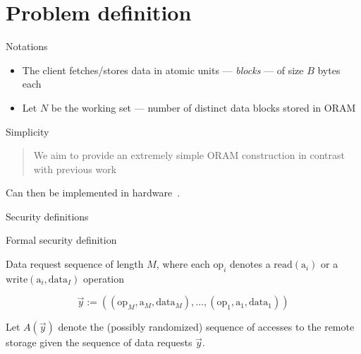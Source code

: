 
\section{Problem definition}

	\begin{frame}{Notations}
		
		\begin{itemize}
			\item 
				The client fetches/stores data in atomic units --- \emph{blocks} --- of size $B$ bytes each
			\item 
				Let $N$ be the working set --- number of distinct data blocks stored in ORAM
		\end{itemize}

	\end{frame}

	\begin{frame}{Simplicity}
		
		\begin{quote}
			We aim to provide an extremely simple ORAM construction in contrast with previous work
		\end{quote}
		
		Can then be implemented in hardware~\cite{Maas:EECS-2014-89}.

	\end{frame}

	\begin{frame}{Security definitions}
		
		\begin{block}{Formal security definition}
			
			Data request sequence of length $M$, where each $\text{op}_i$ denotes a $\text{read}(\text{a}_i)$ or a $\text{write}(\text{a}_i, \text{data}_I)$ operation
			
			\[
				\vec{y} := ( (\text{op}_M, \text{a}_M, \text{data}_M), \ldots , (\text{op}_1, \text{a}_1, \text{data}_1) )
			\]

			Let $A(\vec{y})$ denote the (possibly randomized) sequence of accesses to the remote storage given the sequence of data requests $\vec{y}$.

		\end{block}

	\end{frame}

